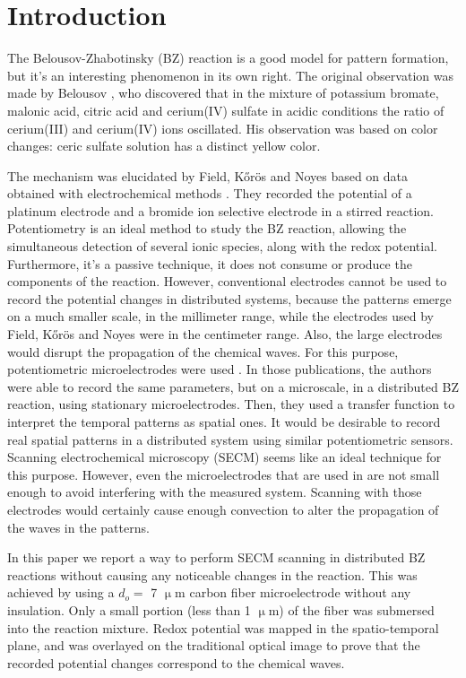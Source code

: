 \documentclass[3p, twocolumn]{elsarticle}
\begin{document}
\section{Introduction}
The Belousov-Zhabotinsky (BZ) reaction is a good model for pattern formation, but it's an interesting phenomenon in its own right.
The original observation was made by Belousov \cite{belousov}, who discovered that in the mixture of potassium bromate, malonic acid, citric acid and cerium(IV) sulfate in acidic conditions the ratio of cerium(III) and cerium(IV) ions oscillated.
His observation was based on color changes: ceric sulfate solution has a distinct yellow color.

The mechanism was elucidated by Field, Kőrös and Noyes based on data obtained with electrochemical methods \cite{fkn1, fkn2}.
They recorded the potential of a platinum electrode and a bromide ion selective electrode in a stirred reaction.
Potentiometry is an ideal method to study the BZ reaction, allowing the simultaneous detection of several ionic species, along with the redox potential.
Furthermore, it's a passive technique, it does not consume or produce the components of the reaction.
However, conventional electrodes cannot be used to record the potential changes in distributed systems, because the patterns emerge on a much smaller scale, in the millimeter range, while the electrodes used by Field, Kőrös and Noyes were in the centimeter range.
Also, the large electrodes would disrupt the propagation of the chemical waves.
For this purpose, potentiometric microelectrodes were used \cite{hess2, hess3}.
In those publications, the authors were able to record the same parameters, but on a microscale, in a distributed BZ reaction, using stationary microelectrodes.
Then, they used a transfer function to interpret the temporal patterns as spatial ones.
It would be desirable to record real spatial patterns in a distributed system using similar potentiometric sensors.
Scanning electrochemical microscopy (SECM) seems like an ideal technique for this purpose. 
However, even the microelectrodes that are used in \cite{hess2, hess3} are not small enough to avoid interfering with the measured system.
Scanning with those electrodes would certainly cause enough convection to alter the propagation of the waves in the patterns.

In this paper we report a way to perform SECM scanning in distributed BZ reactions without causing any noticeable changes in the reaction.
This was achieved by using a $d_o = $ 7 $\upmu$m carbon fiber microelectrode without any insulation.
Only a small portion (less than 1 $\upmu$m) of the fiber was submersed into the reaction mixture.
Redox potential was mapped in the spatio-temporal plane, and was overlayed on the traditional optical image to prove that the recorded potential changes correspond to the chemical waves.
\end{document}
